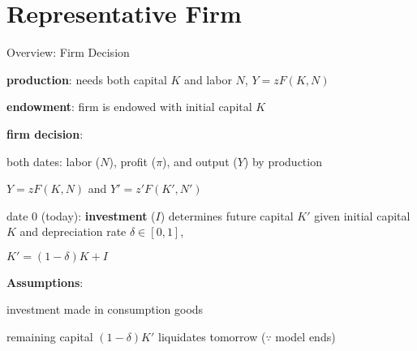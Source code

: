 \documentclass[11pt,aspectratio=169,usenames,dvipsnames]{beamer}
\let\tempone\itemize
\let\temptwo\enditemize
\renewenvironment{itemize}{\tempone\addtolength{\itemsep}{\fill}}{\temptwo}
\let\tempa\enumerate
\let\tempb\endenumerate
\renewenvironment{enumerate}{\tempa\addtolength{\itemsep}{\fill}}{\tempb}
\begin{document}
\section{Representative Firm}
\label{sec:Representative_Firm}

\begin{frame}{Overview: Firm Decision}
\label{slide:Overview__Firm_Decision}
    \begin{itemize}
        \item \textbf{production}: needs both capital $ K $ and labor $ N $, $ Y = zF( K, N ) $
        \item \textbf{endowment}: firm is endowed with initial capital $ K $
        \item \textbf{firm decision}:
        \begin{itemize}
            \item \alert{both dates}: labor ($N$), profit ($\pi$), and output ($Y$) by production
            \begin{center}
                $ \displaystyle Y = z F( K, N ) $ and $ \displaystyle Y' = z' F( K', N' ) $
            \end{center}
            \item \alert{date 0} (today): \textbf{investment} ($I$) determines future capital $ K' $ given initial capital $ K $ and \alert{depreciation rate $ \delta \in [ 0, 1 ] $},
            \begin{center}
                $ \displaystyle K' = ( 1-\delta ) K + I $
            \end{center}
        \end{itemize}
        \item \textbf{Assumptions}:
        \begin{enumerate}
            \item investment made in consumption goods
            \item remaining capital $ ( 1-\delta )K' $ liquidates tomorrow ($\because$ model ends)
        \end{enumerate}
    \end{itemize}
\end{frame}
\end{document}

